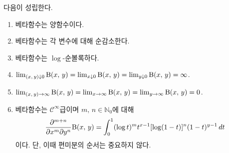 \begin{theorem}\label{thm:betaProp}
    다음이 성립한다.
    \begin{enumerate}
        \item 베타함수는 양함수이다.
        \item 베타함수는 각 변수에 대해 순감소한다.
        \item 베타함수는 $\log$-순볼록하다.
        \item $\lim_{(x,\,y)\downarrow0}\mathrm{B}(x,\,y)=\lim_{x\downarrow0}\mathrm{B}(x,\,y)=\lim_{y\downarrow0}\mathrm{B}(x,\,y)=\infty$.
        \item $\lim_{(x,\,y)\to\infty}\mathrm{B}(x,\,y)=\lim_{x\to\infty}\mathrm{B}(x,\,y)=\lim_{y\to\infty}\mathrm{B}(x,\,y)=0$.
        \item 베타함수는 $\mathcal{C}^\infty$급이며 $m,\,n\in\mathbb{N}_0$에 대해
        \begin{equation*}
            \frac{\partial^{m+n}}{\partial x^m\partial y^n}\mathrm{B}(x,\,y)=\int_0^1(\log t)^mt^{x-1}[\log(1-t)]^n(1-t)^{y-1}\,dt
        \end{equation*}
        이다. 단, 이때 편미분의 순서는 중요하지 않다.
    \end{enumerate}
\end{theorem}

